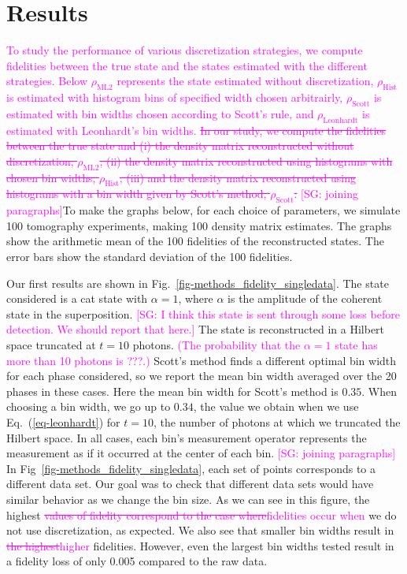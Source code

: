 \documentclass[
reprint,
superscriptaddress,
showpacs,
amsmath,
amssymb,
aps,
pra,
longbibliography
]{revtex4-1}
\providecommand{\aucmnt}[1]{#1}
\providecommand{\editcolor}[2]{\textcolor{#1}{#2}}
\providecommand{\aucmnt}[1]{}
\providecommand{\editcolor}[2]{#2}
\newcommand{\SG}[1]{\editcolor{magenta}{#1}}
\newcommand{\SGs}[1]{\aucmnt{\editcolor{magenta}{\sout{#1}}}}
\newcommand{\SGc}[1]{\aucmnt{\editcolor{magenta}{[SG: #1]}}}
\begin{document}
\section{Results}
\label{results}
\SG{To study the performance of various discretization strategies, we
  compute fidelities between the true state and the states estimated
  with the different strategies. Below $\rho_{\mathrm{ML2}}$
  represents the state estimated without discretization,
  $\rho_{\mathrm{Hist}}$ is estimated with histogram bins of specified
  width chosen arbitrairly, $\rho_{\mathrm{Scott}}$ is estimated with
  bin widths chosen according to Scott's rule, and
  $\rho_{\mathrm{Leonhardt}}$ is estimated with Leonhardt's bin
  widths.} \SGs{In our study, we compute the fidelities between the
  true state and (i) the density matrix reconstructed without
  discretization, $\rho_{\mathrm{ML2}}$; (ii) the density matrix
  reconstructed using histograms with chosen bin widths,
  $\rho_{\mathrm{Hist}}$; (iii) and the density matrix reconstructed
  using histograms with a bin width given by Scott's method,
  $\rho_{\mathrm{Scott}}$.}  \SGc{joining paragraphs}To make the
graphs below, for each choice of parameters, we simulate 100
tomography experiments, making 100 density matrix estimates.  The
graphs show the arithmetic mean of the 100 fidelities of the
reconstructed states. The error bars show the standard deviation of
the 100 fidelities.

Our first results are shown in
Fig.~\ref{fig-methods_fidelity_singledata}. The state considered is a
cat state with $\alpha = 1$, where $\alpha$ is the amplitude of the
coherent state in the superposition. \SGc{I think this state is sent
  through some loss before detection.  We should report that here.}
The state is reconstructed in a Hilbert space truncated at $t=10$
photons. \SG{(The probability that the $\alpha=1$ state has more than
  10 photons is ???.)} Scott's method finds a different optimal bin
width for each phase considered, so we report the mean bin width
averaged over the 20 phases in these cases.  Here the mean bin width
for Scott's method is $0.35$.  When choosing a bin width, we go up to
$0.34$, the value we obtain when we use Eq.~(\ref{eq-leonhardt}) for
$t=10$, the number of photons at which we truncated the Hilbert space.
In all cases, each bin's measurement operator represents the
measurement as if it occurred at the center of each bin. \SGc{joining
  paragraphs} In Fig~\ref{fig-methods_fidelity_singledata}, each set
of points corresponds to a different data set. Our goal was to check
that different data sets would have similar behavior as we change the
bin size. As we can see in this figure, the highest \SGs{values of
  fidelity correspond to the case where}\SG{fidelities occur when} we
do not use discretization, as expected.  We also see that smaller bin
widths result in \SGs{the highest}\SG{higher} fidelities.  However,
even the largest bin widths tested result in a fidelity loss of only
0.005 compared to the raw data.
\end{document}
